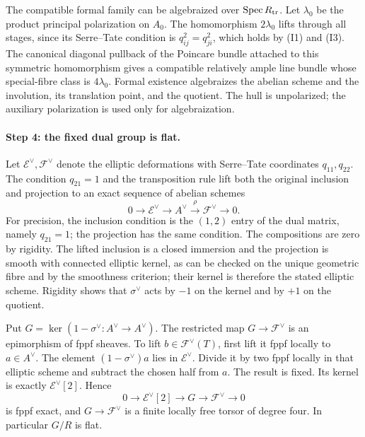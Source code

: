 The compatible formal family can be algebraized over
$\operatorname{Spec}R_{\rm tr}$. Let $\lambda_0$ be the product principal
polarization on $A_0$. The homomorphism $2\lambda_0$ lifts through all
stages, since its Serre--Tate condition is $q_{ij}^2=q_{ji}^2$, which
holds by (I1) and (I3). The canonical diagonal pullback of the
Poincare bundle attached to this symmetric homomorphism gives a
compatible relatively ample line bundle whose special-fibre class is
$4\lambda_0$. Formal existence algebraizes the abelian scheme and
the involution, its translation point, and the quotient. The hull is
unpolarized; the auxiliary polarization is used only for algebraization.

\paragraph{Step 4: the fixed dual group is flat.}
Let $\mathcal E^\vee,\mathcal F^\vee$ denote the elliptic deformations
with Serre--Tate coordinates $q_{11},q_{22}$. The condition $q_{21}=1$
and the transposition rule lift both the original inclusion and projection
to an exact sequence of abelian schemes
\[
 0\longrightarrow\mathcal E^\vee\longrightarrow A^\vee
 \stackrel{\rho}{\longrightarrow}\mathcal F^\vee
 \longrightarrow0.                                      \tag{I5}
\]
For precision, the inclusion condition is the $(1,2)$ entry of the
dual matrix, namely $q_{21}=1$; the projection has the same condition.
The compositions are zero by rigidity. The lifted inclusion is a closed
immersion and the projection is smooth with connected elliptic kernel,
as can be checked on the unique geometric fibre and by the smoothness
criterion; their kernel is therefore the stated elliptic scheme.
Rigidity shows that $\sigma^\vee$ acts by $-1$ on the kernel and by
$+1$ on the quotient.

Put $G=\ker(1-\sigma^\vee:A^\vee\to A^\vee)$.
The restricted map $G\to\mathcal F^\vee$ is an epimorphism of fppf
sheaves. To lift $b\in\mathcal F^\vee(T)$, first lift it fppf locally
to $a\in A^\vee$. The element $(1-\sigma^\vee)a$ lies in
$\mathcal E^\vee$. Divide it by two fppf locally in that elliptic
scheme and subtract the chosen half from $a$. The result is fixed.
Its kernel is exactly $\mathcal E^\vee[2]$. Hence
\[
 0\longrightarrow\mathcal E^\vee[2]\longrightarrow G
 \longrightarrow\mathcal F^\vee\longrightarrow0          \tag{I6}
\]
is fppf exact, and $G\to\mathcal F^\vee$ is a finite locally free
torsor of degree four. In particular $G/R$ is flat.

